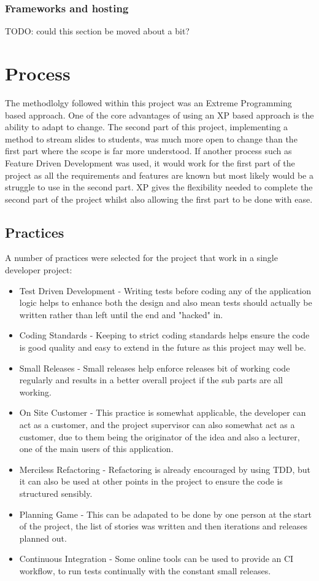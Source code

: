 \subsubsection{Frameworks and hosting}
TODO: could this section be moved about a bit?

\section{Process}
The methodlolgy followed within this project was an Extreme Programming based approach. One of the core advantages of using an XP based approach is the ability to adapt to change. The second part of this project, implementing a method to stream slides to students, was much more open to change than the first part where the scope is far more understood. If another process such as Feature Driven Development was used, it would work for the first part of the project as all the requirements and features are known but most likely would be a struggle to use in the second part. XP gives the flexibility needed to complete the second part of the project whilst also allowing the first part to be done with ease.
\subsection{Practices}
A number of practices were selected for the project that work in a single developer project:
\begin{itemize}
	\item Test Driven Development - Writing tests before coding any of the application logic helps to enhance both the design and also mean tests should actually be written rather than left until the end and "hacked" in.
	\item Coding Standards - Keeping to strict coding standards helps ensure the code is good quality and easy to extend in the future as this project may well be.
	\item Small Releases - Small releases help enforce releases bit of working code regularly and results in a better overall project if the sub parts are all working.
	\item On Site Customer - This practice is somewhat applicable, the developer can act as a customer, and the project supervisor can also somewhat act as a customer, due to them being the originator of the idea and also a lecturer, one of the main users of this application.
	\item Merciless Refactoring - Refactoring is already encouraged by using TDD, but it can also be used at other points in the project to ensure the code is structured sensibly.
	\item Planning Game - This can be adapated to be done by one person at the start of the project, the list of stories was written and then iterations and releases planned out.
	\item Continuous Integration - Some online tools can be used to provide an CI workflow, to run tests continually with the constant small releases.
\end{itemize}

